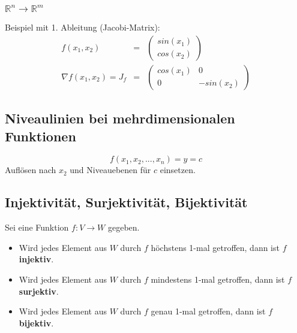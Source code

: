 \subsubsection{$\mathbb{R}^n \rightarrow \mathbb{R}^m$}
\label{ssub:rnrm}
Beispiel mit 1. Ableitung (Jacobi-Matrix): 
\begin{eqnarray*}
	f(x_1,x_2) &=& \left(\begin{array}{c} sin(x_1) \\ cos(x_2)\end{array}\right) \\
	\nabla f(x_1,x_2) = J_f &=& \left( \begin{array}{cc} cos(x_1) & 0 \\ 0 & -sin(x_2) \end{array} \right)
\end{eqnarray*}	

\subsection{Niveaulinien bei mehrdimensionalen Funktionen}
\label{sub:niveaulinien_bei_mehrdimensionalen_funktionen}

\begin{equation}
	f(x_1,x_2,...,x_n) = y = c
\end{equation}
Auflösen nach $x_2$ und Niveauebenen für $c$ einsetzen.

\subsection{Injektivit\"{a}t, Surjektivit\"{a}t, Bijektivit\"{a}t} %
\label{sub:injektivitaet_surjektivitaet_bijektivitaet}

Sei eine Funktion $f : V \rightarrow W$ gegeben.

\begin{itemize}
	\item Wird jedes Element aus $W$ durch $f$ höchstens 1-mal getroffen, dann ist $f$ \textbf{injektiv}.
	\item Wird jedes Element aus $W$ durch $f$ mindestens 1-mal getroffen, dann ist $f$ \textbf{surjektiv}.
	\item Wird jedes Element aus $W$ durch $f$ genau 1-mal getroffen, dann ist $f$ \textbf{bijektiv}.
\end{itemize}

